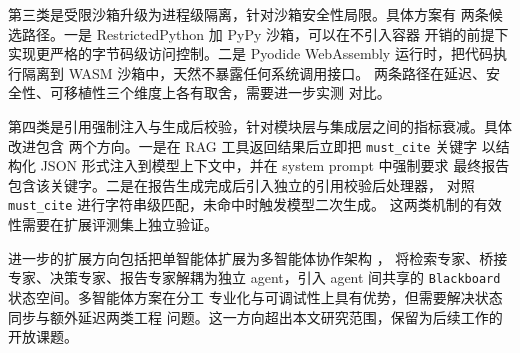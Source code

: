 第三类是受限沙箱升级为进程级隔离，针对沙箱安全性局限。具体方案有
两条候选路径。一是 RestrictedPython 加 PyPy 沙箱，可以在不引入容器
开销的前提下实现更严格的字节码级访问控制。二是 Pyodide WebAssembly
运行时，把代码执行隔离到 WASM 沙箱中，天然不暴露任何系统调用接口。
两条路径在延迟、安全性、可移植性三个维度上各有取舍，需要进一步实测
对比。

第四类是引用强制注入与生成后校验，针对模块层与集成层之间的指标衰减。具体改进包含
两个方向。一是在 RAG 工具返回结果后立即把 \texttt{must\_\bk{}cite} 关键字
以结构化 JSON 形式注入到模型上下文中，并在 system prompt 中强制要求
最终报告包含该关键字。二是在报告生成完成后引入独立的引用校验后处理器，
对照 \texttt{must\_\bk{}cite} 进行字符串级匹配，未命中时触发模型二次生成。
这两类机制的有效性需要在扩展评测集上独立验证。

进一步的扩展方向包括把单智能体扩展为多智能体协作架构 \cite{ref1, ref19}，
将检索专家、桥接专家、决策专家、报告专家解耦为独立 agent，引入
agent 间共享的 \texttt{Blackboard} 状态空间。多智能体方案在分工
专业化与可调试性上具有优势，但需要解决状态同步与额外延迟两类工程
问题。这一方向超出本文研究范围，保留为后续工作的开放课题。
